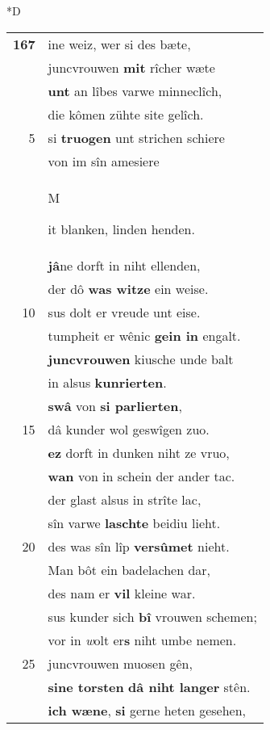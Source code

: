 \documentclass[8pt,a4paper,notitlepage]{article}
\begin{document}
\begin{table}[ht]
\begin{minipage}[t]{0.5\linewidth}
\small
\begin{center}*D
\end{center}
\begin{tabular}{rl}
\textbf{167} & ine weiz, wer si des bæte,\\ 
 & juncvrouwen \textbf{mit} rîcher wæte\\ 
 & \textbf{unt} an lîbes varwe minneclîch,\\ 
 & die kômen zühte site gelîch.\\ 
5 & si \textbf{truogen} unt strichen schiere\\ 
 & von im sîn amesiere\\ 
 & \begin{large}M\end{large}it blanken, linden henden.\\ 
 & \textbf{jâ}ne dorft in niht ellenden,\\ 
 & der dô \textbf{was witze} ein weise.\\ 
10 & sus dolt er vreude unt eise.\\ 
 & tumpheit er wênic \textbf{gein in} engalt.\\ 
 & \textbf{juncvrouwen} kiusche unde balt\\ 
 & in alsus \textbf{kunrierten}.\\ 
 & \textbf{swâ} von \textbf{si parlierten},\\ 
15 & dâ kunder wol geswîgen zuo.\\ 
 & \textbf{ez} dorft in dunken niht ze vruo,\\ 
 & \textbf{wan} von in schein der ander tac.\\ 
 & der glast alsus in strîte lac,\\ 
 & sîn varwe \textbf{laschte} beidiu lieht.\\ 
20 & des was sîn lîp \textbf{versûmet} nieht.\\ 
 & Man bôt ein badelachen dar,\\ 
 & des nam er \textbf{vil} kleine war.\\ 
 & sus kunder sich \textbf{bî} vrouwen schemen;\\ 
 & vor in \textit{w}olt er\textbf{s} niht umbe nemen.\\ 
25 & juncvrouwen muosen gên,\\ 
 & \textbf{sine torsten} \textbf{dâ niht langer} stên.\\ 
 & \textbf{ich wæne}, \textbf{si} gerne heten gesehen,\\ 

\end{tabular}
\end{minipage}
\end{table}
\end{document}
